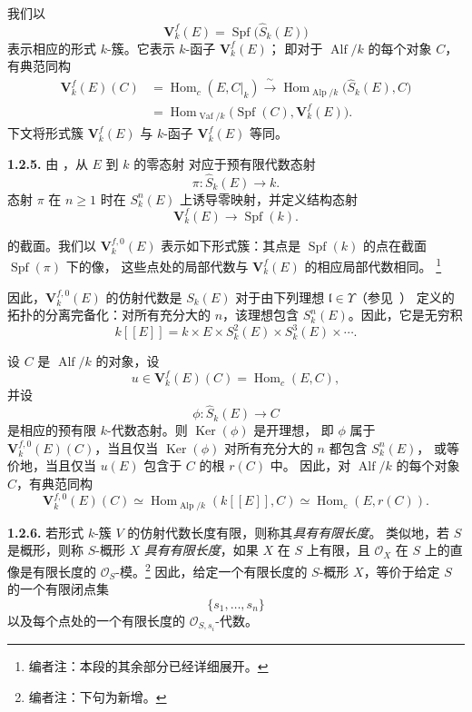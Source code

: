 我们以
\[
  \mathbf V^f_k(E)
  =
  \operatorname{Spf}\bigl(\widehat S_k(E)\bigr)
\]
表示相应的形式 \(k\)-簇。它表示 \(k\)-函子 \(\mathbf V^f_k(E)\)；
即对于 \(\operatorname{Alf}/k\) 的每个对象 \(C\)，有典范同构
\[
\begin{aligned}
  \mathbf V^f_k(E)(C)
  &=
  \operatorname{Hom}_c(E,C|_k)
  \xrightarrow{\ \sim\ }
  \operatorname{Hom}_{\operatorname{Alp}/k}
    \bigl(\widehat S_k(E),C\bigr)
\\
  &=
  \operatorname{Hom}_{\operatorname{Vaf}/k}
    \bigl(\operatorname{Spf}(C),\mathbf V^f_k(E)\bigr).
\end{aligned}
\]
下文将形式簇 \(\mathbf V^f_k(E)\) 与 \(k\)-函子 \(\mathbf V^f_k(E)\) 等同。

\medskip
\noindent\textbf{1.2.5.}
\label{sga3:VIIB:1.2.5}
由 ，从 \(E\) 到 \(k\) 的零态射
对应于预有限代数态射
\[
  \pi:\widehat S_k(E)\longrightarrow k.
\]
态射 \(\pi\) 在 \(n\geq1\) 时在 \(S_k^n(E)\) 上诱导零映射，并定义结构态射
\[
  \mathbf V^f_k(E)\longrightarrow\operatorname{Spf}(k).
\]

的截面。我们以 \(\mathbf V^{f,0}_k(E)\) 表示如下形式簇：其点是
\(\operatorname{Spf}(k)\) 的点在截面 \(\operatorname{Spf}(\pi)\) 下的像，
这些点处的局部代数与 \(\mathbf V^f_k(E)\) 的相应局部代数相同。
\footnote{编者注：本段的其余部分已经详细展开。}

因此，\(\mathbf V^{f,0}_k(E)\) 的仿射代数是 \(S_k(E)\) 对于由下列理想
\(\mathfrak l\in\Upsilon\)\textup{（参见\ ）}
定义的拓扑的分离完备化：对所有充分大的 \(n\)，该理想包含
\(S_k^n(E)\)。因此，它是无穷积
\[
  k[[E]]
  =
  k\times E\times S_k^2(E)\times S_k^3(E)\times\cdots.
\]

设 \(C\) 是 \(\operatorname{Alf}/k\) 的对象，设
\[
  u\in\mathbf V^f_k(E)(C)=\operatorname{Hom}_c(E,C),
\]
并设
\[
  \phi:\widehat S_k(E)\longrightarrow C
\]
是相应的预有限 \(k\)-代数态射。则 \(\operatorname{Ker}(\phi)\) 是开理想，
即 \(\phi\) 属于 \(\mathbf V^{f,0}_k(E)(C)\)，当且仅当
\(\operatorname{Ker}(\phi)\) 对所有充分大的 \(n\) 都包含 \(S_k^n(E)\)，
或等价地，当且仅当 \(u(E)\) 包含于 \(C\) 的根 \(r(C)\) 中。
因此，对 \(\operatorname{Alf}/k\) 的每个对象 \(C\)，有典范同构
\[
  \mathbf V^{f,0}_k(E)(C)
  \simeq
  \operatorname{Hom}_{\operatorname{Alp}/k}(k[[E]],C)
  \simeq
  \operatorname{Hom}_c(E,r(C)).
\]

\medskip
\noindent\textbf{1.2.6.}
\label{sga3:VIIB:1.2.6}
若形式 \(k\)-簇 \(V\) 的仿射代数长度有限，则称其\emph{具有有限长度}。
类似地，若 \(S\) 是概形，则称 \(S\)-概形 \(X\) \emph{具有有限长度}，如果
\(X\) 在 \(S\) 上有限，且 \(\mathcal O_X\) 在 \(S\) 上的直像是有限长度的
\(\mathcal O_S\)-模。\footnote{编者注：下句为新增。}
因此，给定一个有限长度的 \(S\)-概形 \(X\)，等价于给定 \(S\) 的一个有限闭点集
\[
  \{s_1,\ldots,s_n\}
\]
以及每个点处的一个有限长度的 \(\mathcal O_{S,s_i}\)-代数。

